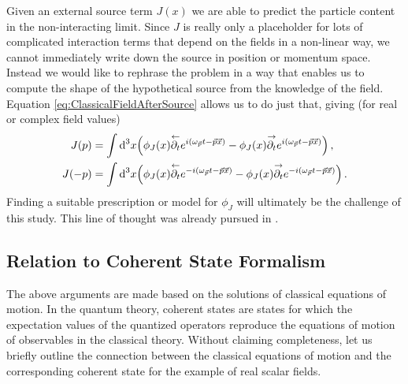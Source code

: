 Given an external source term $J(x)$ we are able to predict the particle content in the non-interacting limit. Since $J$ is really only a placeholder for lots of complicated interaction terms that depend on the fields in a non-linear way, we cannot immediately write down the source in position or momentum space. Instead we would like to rephrase the problem in a way that enables us to compute the shape of the hypothetical source from the knowledge of the field. Equation \eqref{eq:ClassicalFieldAfterSource} allows us to do just that, giving (for real or complex field values)
\begin{subequations}
    \begin{align}        
        J(p)&=\int\text{d}^3x\Big(\phi_J(x)\overset{\leftarrow}{\partial_t}e^{{i}(\omega_{\vec{p}}t-\vec{p}\vec{x})}-\phi_J(x)\overset{\rightarrow}{\partial_t}e^{{i}(\omega_{\vec{p}}t-\vec{p}\vec{x})}\Big)\,,\\
        J(-p)&=\int\text{d}^3x\Big(\phi_J(x)\overset{\leftarrow}{\partial_t}e^{-{i}(\omega_{\vec{p}}t-\vec{p}\vec{x})}-\phi_J(x)\overset{\rightarrow}{\partial_t}e^{-{i}(\omega_{\vec{p}}t-\vec{p}\vec{x})}\Big)\,.
    \end{align}
    \label{eq:SourceFieldRelation}
\end{subequations} 
Finding a suitable prescription or model for $\phi_J$ will ultimately be the challenge of this study. This line of thought was already pursued in \cite{Amelino-CameliaEtAl_1997}.


\subsection{Relation to Coherent State Formalism}

The above arguments are made based on the solutions of classical equations of motion. In the quantum theory, coherent states are states for which the expectation values of the quantized operators reproduce the equations of motion of observables in the classical theory. Without claiming completeness, let us briefly outline the connection between the classical equations of motion and the corresponding coherent state for the example of real scalar fields.

